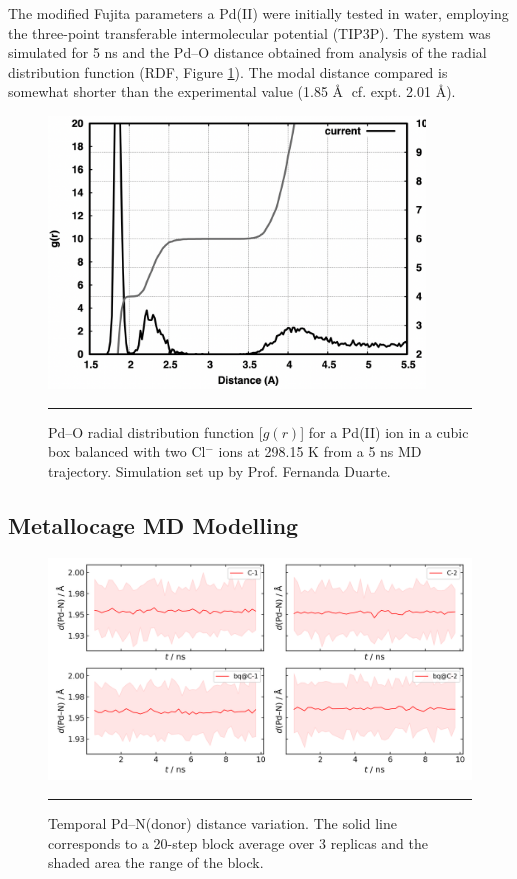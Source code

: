\documentclass[../../main.tex]{subfiles}
\begin{document}
The modified Fujita parameters a Pd(II) were initially tested in water, employing the three-point transferable intermolecular potential (TIP3P).\cite{Jorgensen1983} The system was simulated for 5 ns and the Pd–O distance obtained from analysis of the radial distribution function (RDF, Figure \ref{fig::si_da_1}). The modal distance compared is somewhat shorter than the experimental value (1.85 \AA$\;$ cf. expt.\cite{Persson2010} 2.01 \AA).


\begin{figure}[h!]
	\vspace{0.4cm}
	\centering
	\includegraphics[width=10cm]{3/da//figs/figS1}
	\vspace{0.2cm}
	\hrule
	\caption{Pd–O radial distribution function [$g(r)$] for a Pd(II) ion in a cubic box balanced with two Cl$^{-}$ ions at 298.15 K from a 5 ns MD trajectory. Simulation set up by Prof. Fernanda Duarte.}
	\label{fig::si_da_1}
\end{figure}


\subsection{Metallocage MD Modelling}
\label{section::da_si_1_2}

\begin{figure}[h!]
	\vspace{0.4cm}
	\centering
	\includegraphics[width=\textwidth]{3/da//figs/figS2}
	\vspace{0.2cm}
	\hrule
	\caption{Temporal Pd–N(donor) distance variation. The solid line corresponds to a 20-step block average over 3 replicas and the shaded area the range of the block.}
	\label{fig::si_da_2}
\end{figure}
\end{document}
